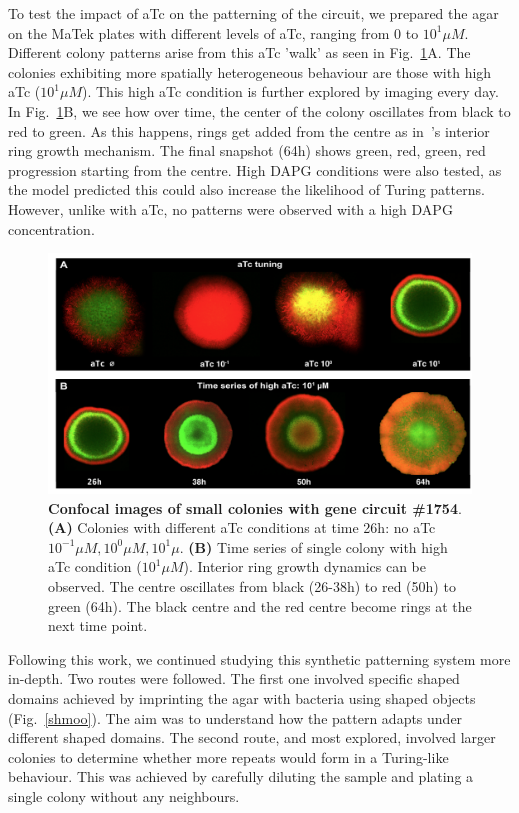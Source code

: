 To test the impact of aTc on the patterning of the circuit, we prepared the agar on the MaTek plates with different levels of aTc, ranging from 0 to $10^1 \mu M$.
Different colony patterns arise from this aTc 'walk' as seen in Fig.~\ref{atcwalk_timeseries_confocal}A.
The colonies exhibiting more spatially heterogeneous behaviour are those with high aTc ($10^1 \mu M$).
This high aTc condition is further explored by imaging every day.
In Fig.~\ref{atcwalk_timeseries_confocal}B, we see how over time, the center of the colony oscillates from black to red to green.
As this happens, rings get added from the centre as in~\cite{Konow2019}'s interior ring growth mechanism.
The final snapshot (64h) shows green, red, green, red progression starting from the centre.
High DAPG conditions were also tested, as the model predicted this could also increase the likelihood of Turing patterns.
However, unlike with aTc, no patterns were observed with a high DAPG concentration.
\begin{figure}[H]

    \includegraphics[width=1\textwidth]{chapters/Chapter 3/atcwalk_timeseries_confocal}
    \caption{\textbf{Confocal images of small colonies with gene circuit \#1754}. \textbf{(A)} Colonies with different aTc conditions at time 26h: no aTc $10^{-1} \mu M,10^{0} \mu M,10^{1} \mu  $. \textbf{(B)} Time series of single colony with high aTc condition ($10^1 \mu M$). Interior ring growth dynamics can be observed. The centre oscillates from black (26-38h) to red (50h) to green (64h). The black centre and the red centre become rings at the next time point. }
    \label{atcwalk_timeseries_confocal}
\end{figure}

Following this work, we continued studying this synthetic patterning system more in-depth.
Two routes were followed.
The first one involved specific shaped domains achieved by imprinting the agar with bacteria using shaped objects (Fig.~\ref{shmoo}).
The aim was to understand how the pattern adapts under different shaped domains.
The second route, and most explored, involved larger colonies to determine whether more repeats would form in a Turing-like behaviour.
This was achieved by carefully diluting the sample and plating a single colony without any neighbours.

